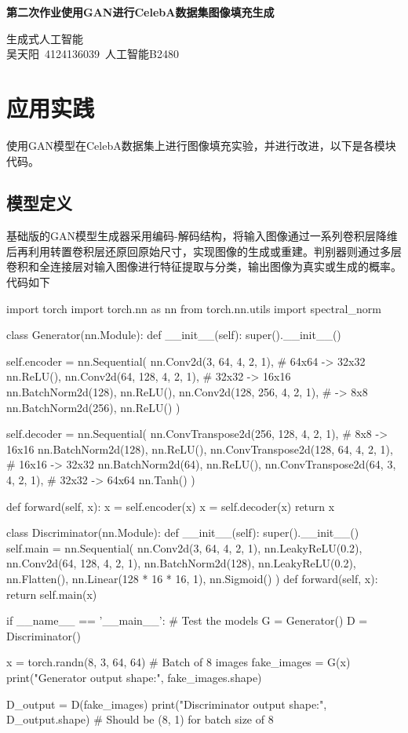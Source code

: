 \documentclass[12pt, a4paper, oneside]{ctexart}
\numberwithin{equation}{section}  %
\newenvironment{myTitle}[1]{
    \begin{center}
    {\zihao{-2}\bf #1\\}
    \zihao{-4}\it
}{\end{center}}  %
\begin{document}
\begin{myTitle}{第二次作业\quad 使用GAN进行CelebA数据集图像填充生成}
    生成式人工智能\\ 吴天阳\ 4124136039\ 人工智能B2480
\end{myTitle}
\section{应用实践}
使用GAN模型在CelebA数据集上进行图像填充实验，并进行改进，以下是各模块代码。
\subsection{模型定义}
基础版的GAN模型生成器采用编码-解码结构，将输入图像通过一系列卷积层降维后再利用转置卷积层还原回原始尺寸，实现图像的生成或重建。判别器则通过多层卷积和全连接层对输入图像进行特征提取与分类，输出图像为真实或生成的概率。代码如下
\begin{pythoncode}
import torch
import torch.nn as nn
from torch.nn.utils import spectral_norm

class Generator(nn.Module):
    def __init__(self):
        super().__init__()

        self.encoder = nn.Sequential(
            nn.Conv2d(3, 64, 4, 2, 1),  # 64x64 -> 32x32
            nn.ReLU(),
            nn.Conv2d(64, 128, 4, 2, 1),  # 32x32 -> 16x16
            nn.BatchNorm2d(128),
            nn.ReLU(),
            nn.Conv2d(128, 256, 4, 2, 1),  # -> 8x8
            nn.BatchNorm2d(256),
            nn.ReLU()
        )

        self.decoder = nn.Sequential(
            nn.ConvTranspose2d(256, 128, 4, 2, 1),  # 8x8 -> 16x16
            nn.BatchNorm2d(128),
            nn.ReLU(),
            nn.ConvTranspose2d(128, 64, 4, 2, 1),   # 16x16 -> 32x32
            nn.BatchNorm2d(64),
            nn.ReLU(),
            nn.ConvTranspose2d(64, 3, 4, 2, 1),     # 32x32 -> 64x64
            nn.Tanh()
        )

    def forward(self, x):
        x = self.encoder(x)
        x = self.decoder(x)
        return x

class Discriminator(nn.Module):
    def __init__(self):
        super().__init__()
        self.main = nn.Sequential(
            nn.Conv2d(3, 64, 4, 2, 1),
            nn.LeakyReLU(0.2),
            nn.Conv2d(64, 128, 4, 2, 1),
            nn.BatchNorm2d(128),
            nn.LeakyReLU(0.2),
            nn.Flatten(),
            nn.Linear(128 * 16 * 16, 1),
            nn.Sigmoid()
        )
    def forward(self, x):
        return self.main(x)

if __name__ == '__main__':
    # Test the models
    G = Generator()
    D = Discriminator()
    
    x = torch.randn(8, 3, 64, 64)  # Batch of 8 images
    fake_images = G(x)
    print("Generator output shape:", fake_images.shape)
    
    D_output = D(fake_images)
    print("Discriminator output shape:", D_output.shape)  # Should be (8, 1) for batch size of 8
\end{pythoncode}
\end{document}
